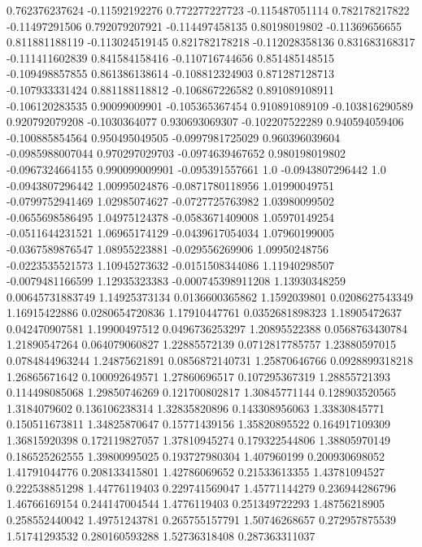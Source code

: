  0.762376237624   -0.11592192276
 0.772277227723  -0.115487051114
 0.782178217822   -0.11497291506
 0.792079207921  -0.114497458135
  0.80198019802   -0.11369656655
 0.811881188119  -0.113024519145
 0.821782178218  -0.112028358136
 0.831683168317  -0.111411602839
 0.841584158416  -0.110716744656
 0.851485148515  -0.109498857855
 0.861386138614  -0.108812324903
 0.871287128713  -0.107933331424
 0.881188118812  -0.106867226582
 0.891089108911  -0.106120283535
  0.90099009901  -0.105365367454
 0.910891089109  -0.103816290589
 0.920792079208    -0.1030364077
 0.930693069307  -0.102207522289
 0.940594059406  -0.100885854564
 0.950495049505  -0.0997981725029
 0.960396039604  -0.0985988007044
 0.970297029703  -0.0974639467652
 0.980198019802  -0.0967324664155
 0.990099009901  -0.095391557661
            1.0  -0.0943807296442
            1.0  -0.0943807296442
  1.00995024876  -0.0871780118956
  1.01990049751  -0.0799752941469
  1.02985074627  -0.0727725763982
  1.03980099502  -0.0655698586495
  1.04975124378  -0.0583671409008
  1.05970149254  -0.0511644231521
  1.06965174129  -0.0439617054034
  1.07960199005  -0.0367589876547
  1.08955223881  -0.029556269906
  1.09950248756  -0.0223535521573
  1.10945273632  -0.0151508344086
  1.11940298507  -0.0079481166599
  1.12935323383  -0.000745398911208
  1.13930348259  0.00645731883749
  1.14925373134  0.0136600365862
   1.1592039801  0.0208627543349
  1.16915422886  0.0280654720836
  1.17910447761  0.0352681898323
  1.18905472637   0.042470907581
  1.19900497512  0.0496736253297
  1.20895522388  0.0568763430784
  1.21890547264   0.064079060827
  1.22885572139  0.0712817785757
  1.23880597015  0.0784844963244
  1.24875621891  0.0856872140731
  1.25870646766  0.0928899318218
  1.26865671642   0.100092649571
  1.27860696517   0.107295367319
  1.28855721393   0.114498085068
  1.29850746269   0.121700802817
  1.30845771144   0.128903520565
   1.3184079602   0.136106238314
  1.32835820896   0.143308956063
  1.33830845771   0.150511673811
  1.34825870647    0.15771439156
  1.35820895522   0.164917109309
  1.36815920398   0.172119827057
  1.37810945274   0.179322544806
  1.38805970149   0.186525262555
  1.39800995025   0.193727980304
    1.407960199   0.200930698052
  1.41791044776   0.208133415801
  1.42786069652    0.21533613355
  1.43781094527   0.222538851298
  1.44776119403   0.229741569047
  1.45771144279   0.236944286796
  1.46766169154   0.244147004544
   1.4776119403   0.251349722293
  1.48756218905   0.258552440042
  1.49751243781   0.265755157791
  1.50746268657   0.272957875539
  1.51741293532   0.280160593288
  1.52736318408   0.287363311037
